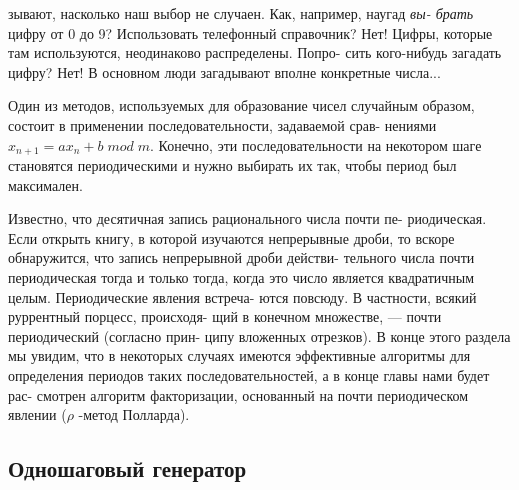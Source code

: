 \documentclass{../template/mai_book}
\begin{document}
\noindent зывают, насколько наш выбор не случаен. Как, например, наугад \textit{вы- \linebreak брать} цифру от 0 до 9? Использовать телефонный справочник? Нет! \linebreak Цифры, которые там используются, неодинаково распределены. Попро- \linebreak сить кого-нибудь загадать цифру? Нет! В основном люди загадывают \linebreak вполне конкретные числа... \par 

Один из методов, используемых для образование чисел случайным \linebreak образом, состоит в применении последовательности, задаваемой срав- \linebreak нениями $x_{n+1} = ax_{n} + b \; mod \; m$. Конечно, эти последовательности на \linebreak некотором шаге становятся периодическими и нужно выбирать их так, \linebreak чтобы период был максимален. \par 

Известно, что десятичная запись рационального числа почти пе- \linebreak риодическая. Если открыть книгу, в которой изучаются непрерывные \linebreak дроби, то вскоре обнаружится, что запись непрерывной дроби действи- \linebreak тельного числа почти периодическая тогда и только тогда, когда это \linebreak число является квадратичным целым. Периодические явления встреча- \linebreak ются повсюду. В частности, всякий руррентный порцесс, происходя- \linebreak щий в конечном множестве, --- почти периодический (согласно прин- \linebreak ципу вложенных отрезков). В конце этого раздела мы увидим, что
в \linebreak некоторых случаях имеются эффективные алгоритмы для определения \linebreak периодов таких последовательностей, а в конце главы нами будет рас- \linebreak смотрен алгоритм факторизации, основанный на почти периодическом \linebreak явлении ($\rho$ -метод Полларда). \par

\subsection{Одношаговый генератор}
\end{document}
